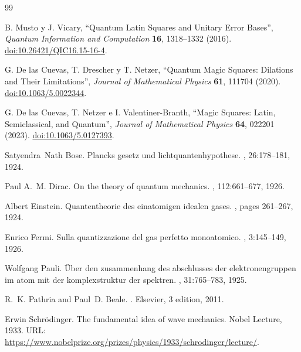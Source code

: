 \begingroup\fontsize{9.2}{10.6}\selectfont
\begin{thebibliography}{99}\fontsize{9.2}{10.6}\selectfont\setlength{\parsep}{0pt}\setlength{\itemsep}{1pt}\setlength{\parskip}{0pt}
{}
 B. Musto y J. Vicary, ``Quantum Latin Squares and Unitary Error Bases'', \emph{Quantum Information and Computation} \textbf{16}, 1318--1332 (2016). \href{https://doi.org/10.26421/QIC16.15-16-4}{doi:10.26421/QIC16.15-16-4}.

 G. De las Cuevas, T. Drescher y T. Netzer, ``Quantum Magic Squares: Dilations and Their Limitations'', \emph{Journal of Mathematical Physics} \textbf{61}, 111704 (2020). \href{https://doi.org/10.1063/5.0022344}{doi:10.1063/5.0022344}.

 G. De las Cuevas, T. Netzer e I. Valentiner-Branth, ``Magic Squares: Latin, Semiclassical, and Quantum'', \emph{Journal of Mathematical Physics} \textbf{64}, 022201 (2023). \href{https://doi.org/10.1063/5.0127393}{doi:10.1063/5.0127393}.

Satyendra~Nath Bose.
\newblock Plancks gesetz und lichtquantenhypothese.
, 26:178--181, 1924.

Paul A.~M. Dirac.
\newblock On the theory of quantum mechanics.
, 112:661--677, 1926.

Albert Einstein.
\newblock Quantentheorie des einatomigen idealen gases.
,
  pages 261--267, 1924.

Enrico Fermi.
\newblock Sulla quantizzazione del gas perfetto monoatomico.
, 3:145--149, 1926.

Wolfgang Pauli.
\newblock Über den zusammenhang des abschlusses der elektronengruppen im atom
  mit der komplexstruktur der spektren.
, 31:765--783, 1925.

R.~K. Pathria and Paul~D. Beale.
.
\newblock Elsevier, 3 edition, 2011.

Erwin Schrödinger.
\newblock The fundamental idea of wave mechanics.
\newblock Nobel Lecture, 1933.
\newblock URL:
  \url{https://www.nobelprize.org/prizes/physics/1933/schrodinger/lecture/}.


\end{thebibliography}
